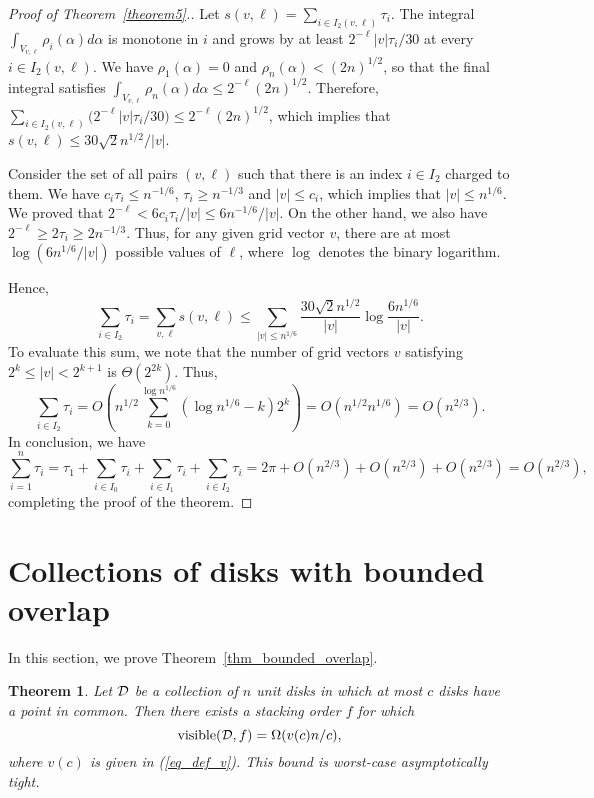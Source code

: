 \documentclass[11pt]{article}
\newtheorem{thm}{Theorem}             \newtheorem{lem}[thm]{Lemma}
\DeclareMathOperator{\vis}{\mathrm{visible}}
\begin{document}
\begin{proof}[Proof of Theorem~\ref{theorem5}.]
Let $s(v,\ell)=\sum_{i\in I_2(v,\ell)} \tau_i$. The integral $\int_{V_{v,\ell}}\rho_i(\alpha)d\alpha$
is monotone in $i$ and grows by at least $2^{-\ell}|v|\tau_i/30$ at every
$i \in I_2(v,\ell)$. We have $\rho_1(\alpha)=0$ and
$\rho_n(\alpha)<(2n)^{1/2}$, so that the final integral satisfies
$\int_{V_{v,\ell}}\rho_n(\alpha)d\alpha \le 2^{-\ell}(2n)^{1/2}$. Therefore, $\sum_{i\in I_2(v,\ell)} \bigl( 2^{-\ell}|v|\tau_i/30 \bigr) \le 2^{-\ell}(2n)^{1/2}$, which implies that $s(v,\ell)\le 30\sqrt{2}n^{1/2}/|v|$.

Consider the set of all pairs $(v,\ell)$ such that there is an index $i\in I_2$ charged to them. We have $c_i\tau_i\le
n^{-1/6}$, $\tau_i\ge n^{-1/3}$ and $|v|\le c_i$, which implies that $|v|\le
n^{1/6}$. We proved that $2^{-\ell}<6c_i\tau_i/|v|\le6n^{-1/6}/|v|$.
On the other hand, we also have $2^{-\ell}\ge2\tau_i\ge2n^{-1/3}$. Thus,
for any given grid vector $v$, there are at most $\log(6n^{1/6}/|v|)$
possible values of $\ell$, where $\log$ denotes the binary logarithm.

Hence, $$\sum_{i\in I_2}\tau_i=\sum_{v,\ell}s(v,\ell)\le\sum_{|v|\le
n^{1/6}}\frac{30\sqrt2n^{1/2}}{|v|}\log\frac{6n^{1/6}}{|v|}.$$
To evaluate this sum, we note that the number of grid vectors $v$ satisfying $2^k\le |v| < 2^{k+1}$ is $\Theta(2^{2k})$. Thus,
$$\sum_{i\in I_2}\tau_i = O{\left( n^{1/2}\sum_{k=0}^{\log n^{1/6}} (\log n^{1/6} - k) 2^k \right)} = O(n^{1/2}n^{1/6}) = O(n^{2/3}).$$
In conclusion, we have $$\sum_{i=1}^n\tau_i=\tau_1+\sum_{i\in I_0}\tau_i+\sum_{i\in
I_1}\tau_i+\sum_{i\in
I_2}\tau_i=2\pi+O(n^{2/3})+O(n^{2/3})+O(n^{2/3})=O(n^{2/3}),$$
completing the proof of the theorem.
\end{proof}

\section{Collections of disks with bounded overlap}

In this section, we prove Theorem~\ref{thm_bounded_overlap}.

{
\renewcommand{\thethm}{6}
\begin{thm}
Let $\cal D$ be a collection of $n$ unit disks in which at most $c$ disks have a point in common. Then there exists a stacking order $f$ for which
$$\vis({\cal D}, f) = \Omega(v(c) n / c),$$
where $v(c)$ is given in (\ref{eq_def_v}). This bound is worst-case asymptotically tight.
\end{thm}
\addtocounter{thm}{-1}
}
\end{document}
